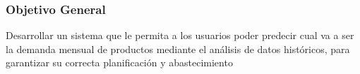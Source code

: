 \subsubsection{Objetivo General}
Desarrollar un sistema que le permita a los usuarios poder predecir cual va a ser la demanda mensual de productos mediante el análisis de datos históricos, para garantizar su correcta planificación y abastecimiento
